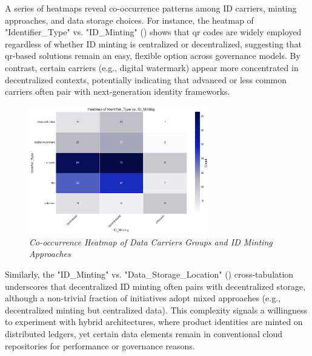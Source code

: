 A series of heatmaps reveal co-occurrence patterns among ID carriers, minting approaches, and data storage choices. For instance, the heatmap of "Identifier\_Type" vs. "ID\_Minting" 
() shows that \ac{qr} codes are widely employed regardless of whether ID minting is centralized or decentralized, suggesting that \ac{qr}-based solutions remain an easy, flexible option across governance models. By contrast, certain carriers (e.g., digital watermark) appear more concentrated in decentralized contexts, potentially indicating that advanced or less common carriers often pair with next-generation identity frameworks.

\begin{figure}[htbp]
  \centering
  \includegraphics[width=0.7\textwidth]{figures/initiatives_data_carrier_vs_minting.png}
  \caption{%
    \textit{Co-occurrence Heatmap of Data Carriers Groups and ID Minting Approaches} 
  }
  \label{fig:initiatives_data_carrier_vs_minting}
\end{figure}

Similarly, the "ID\_Minting" vs. "Data\_Storage\_Location" () cross-tabulation underscores that decentralized ID minting often pairs with decentralized storage, although a non-trivial fraction of initiatives adopt mixed approaches (e.g., decentralized minting but centralized data). This complexity signals a willingness to experiment with hybrid architectures, where product identities are minted on distributed ledgers, yet certain data elements remain in conventional cloud repositories for performance or governance reasons.


